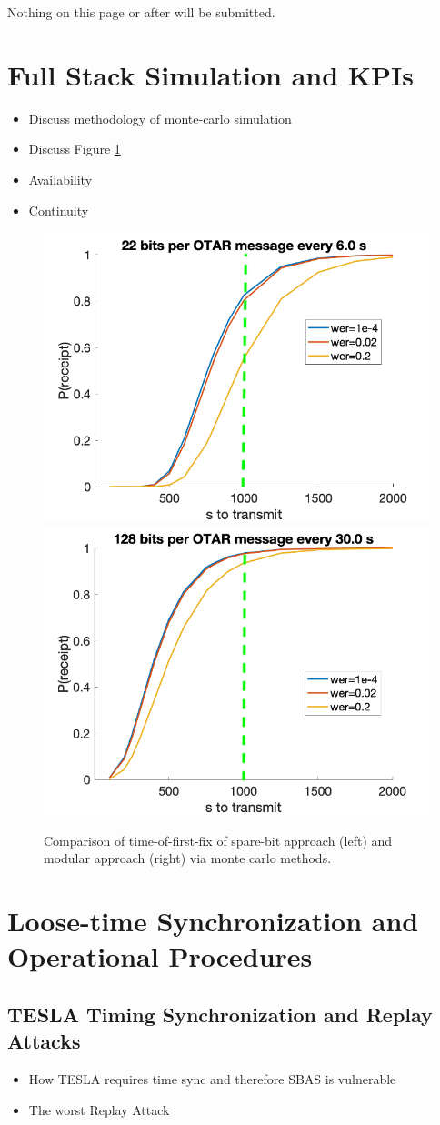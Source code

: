 \documentclass[letterpaper,times]{IONconf/IONconf}
\begin{document}



\pagebreak

Nothing on this page or after will be submitted.

\pagebreak

\section{Full Stack Simulation and KPIs}

\begin{itemize}
	\item Discuss methodology of monte-carlo simulation
	\item Discuss Figure \ref{fig:time-of-first-fix-mc}
	\item Availability
	\item Continuity
\end{itemize}

\begin{figure}[H]
	\centering
	\includegraphics[width=0.4\linewidth]{fig/integrated_mc.png}
	\includegraphics[width=0.4\linewidth]{fig/modular_mc.png}
	\caption{Comparison of time-of-first-fix of spare-bit approach (left) and modular approach (right) via monte carlo methods.}
	\label{fig:time-of-first-fix-mc}
\end{figure}

\section{Loose-time Synchronization and Operational Procedures}

\subsection{TESLA Timing Synchronization and Replay Attacks}
\begin{itemize}
	\item How TESLA requires time sync and therefore SBAS is vulnerable
	\item The worst Replay Attack
\end{itemize}
\end{document}

